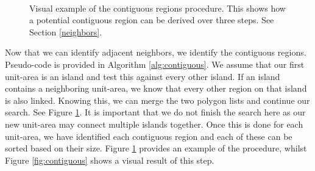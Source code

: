 \begin{figure}
\centering
{}~~~
~~~
~~~
\caption{ Visual example of the contiguous regions procedure. This shows how a potential contiguous region can be derived over three steps. See Section \ref{neighbors}.
} \label{fig:contiguousP} \vspace{-0.2cm}
\end{figure} 


Now that we can identify adjacent neighbors, we identify the contiguous regions. Pseudo-code is provided in Algorithm \ref{alg:contiguous}. We assume that our first unit-area is an island and test this against every other island. If an island contains a neighboring unit-area, we know that every other region on that island is also linked. Knowing this, we can merge the two polygon lists and continue our search. See Figure \ref{fig:contiguousP}. It is important that we do not finish the search here as our new unit-area may connect multiple islands together. Once this is done for each unit-area, we have identified each contiguous region and each of these can be sorted based on their size. Figure \ref{fig:contiguousP} provides an example of the procedure, whilst Figure \ref{fig:contiguous} shows a visual result of this step.

